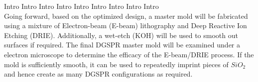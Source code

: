 % 
% 
%
Intro
Intro
Intro
Intro
Intro
Intro
Intro
Intro
Intro\\
Going forward, based on the optimized design, a master mold will be fabricated using a mixture of Electron-beam (E-beam) lithography and Deep Reactive Ion Etching (DRIE). Additionally, a wet-etch (KOH) will be used to smooth out surfaces if required. The final DGSPR master mold will be examined under a electron microscope to determine the efficacy of the E-beam/DRIE process. If the mold is sufficiently smooth, it can be used to repeatedly imprint pieces of $SiO_2$ and hence create as many DGSPR configurations as required. 